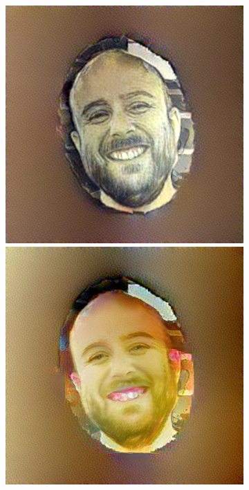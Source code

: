 \begin{figure}
\begin{subfigure}{0.22\linewidth}
        \includegraphics[width=\textwidth]{Figures/failed/stross/textures/16/stylized_view_8-8-5-1_123851_791.png}
        \includegraphics[width=\textwidth]{Figures/failed/stross/textures/59/stylized_view_8-8-5-1_123851_791.png}

\end{subfigure}
\end{figure}
